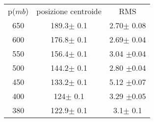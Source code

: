 \begin{center}
\begin{tabulary}{\textwidth}{CCC}
\toprule
p($mb$) &  posizione centroide & RMS \\ 
650 &189.3$\pm$ 0.1& 2.70$\pm$ 0.08\\
600 &176.8$\pm$ 0.1& 2.69$\pm$ 0.04\\
550 &156.4$\pm$ 0.1& 3.04 $\pm$0.04\\
500 &144.2$\pm$ 0.1& 2.80 $\pm$0.04\\
450 &133.2$\pm$ 0.1 &5.12 $\pm$0.07\\
400 &124$\pm$ 0.1 &3.29 $\pm$0.05\\
380 &122.9$\pm$ 0.1& 3.1$\pm$ 0.1\\
\bottomrule
\end{tabulary}
\end{center}